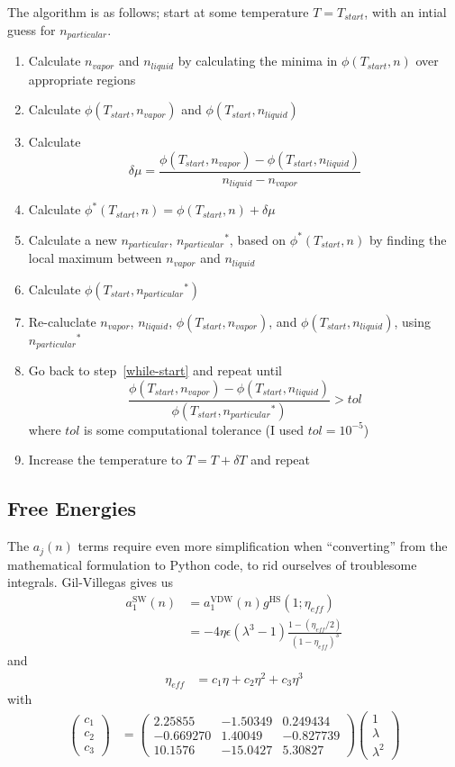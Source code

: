 \documentclass[letterpaper,twocolumn,amsmath,amssymb,prb]{revtex4-1}
\newcommand{\npart}{\ensuremath{n_{particular}}}
\newcommand{\nliq}{\ensuremath{n_{liquid}}}
\newcommand{\nvap}{\ensuremath{n_{vapor}}}
\newcommand{\1}{\ensuremath{\textbf{r}_1}}
\newcommand{\2}{\ensuremath{\textbf{r}_2}}
\newcommand{\3}{\ensuremath{\textbf{r}_3}}
\newcommand{\4}{\ensuremath{\textbf{r}_4}}
\begin{document}
The algorithm is as follows; start at some temperature $T=T_{start}$, with an intial guess for $\npart$.
\begin{enumerate}
  \item Calculate $\nvap$ and $\nliq$ by calculating the minima in $\phi(T_{start},n)$ over appropriate regions
  \item Calculate $\phi(T_{start},\nvap)$ and $\phi(T_{start},\nliq)$ \label{while-start}
  \item Calculate \[\delta\mu = \frac{\phi(T_{start},\nvap) - \phi(T_{start},\nliq)}{\nliq - \nvap}\]
  \item Calculate $\phi^*(T_{start},n) = \phi(T_{start},n) + \delta\mu$
  \item Calculate a new $\npart$, $\npart^*$, based on $\phi^*(T_{start},n)$ by finding the local maximum between $\nvap$ and $\nliq$
  \item Calculate $\phi(T_{start},\npart^*)$
  \item Re-caluclate $\nvap$, $\nliq$, $\phi(T_{start},\nvap)$, and $\phi(T_{start},\nliq)$, using $\npart^*$
  \item Go back to step~\ref{while-start} and repeat until \[ \frac{\phi(T_{start},\nvap) - \phi(T_{start},\nliq)}{\phi(T_{start},\npart^*)} > tol  \] where $tol$ is some computational tolerance (I used $tol=10^{-5}$)
  \item Increase the temperature to $T = T + \delta T$ and repeat
\end{enumerate}

\subsection{Free Energies}\label{subsec:free-energies}
The $a_j(n)$ terms require even more simplification when ``converting'' from the mathematical formulation to Python code, to rid ourselves of troublesome integrals. Gil-Villegas gives us
\begin{align}
  a_1^\text{SW}(n) &= a_1^\text{VDW}(n)g^\text{HS}(1;\eta_{eff}) \\
  &= -4\eta\epsilon(\lambda^3 - 1)\frac{1 - \left( \eta_{eff}/2 \right)}{(1 - \eta_{eff})^3}
\end{align}
and
\begin{align}
  \eta_{eff} &= c_1\eta + c_2\eta^2 + c_3\eta^3
\end{align}
with
\begin{align}
  \left( \begin{array}{c}
    c_1 \\
    c_2 \\
    c_3
    \end{array} \right)
  &= \left( \begin{array}{ccc}
    2.25855 & -1.50349 & 0.249434 \\
    -0.669270 & 1.40049 & -0.827739 \\
    10.1576 & -15.0427 & 5.30827
    \end{array} \right)
  \left( \begin{array}{c}
    1 \\
    \lambda \\
    \lambda^2
    \end{array} \right)
\end{align}
\end{document}
